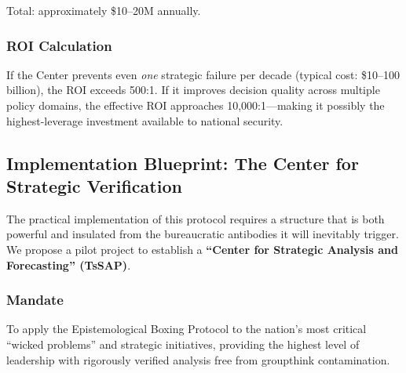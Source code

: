 \documentclass[11pt,a4paper]{article}
\begin{document}
\noindent Total: approximately \$10--20M annually.

\subsubsection{ROI Calculation}
If the Center prevents even \textit{one} strategic failure per decade (typical cost: \$10--100 billion), the ROI exceeds 500:1. If it improves decision quality across multiple policy domains, the effective ROI approaches 10,000:1—making it possibly the highest-leverage investment available to national security.

\subsection{Implementation Blueprint: The Center for Strategic Verification}
The practical implementation of this protocol requires a structure that is both powerful and insulated from the bureaucratic antibodies it will inevitably trigger. We propose a pilot project to establish a \textbf{``Center for Strategic Analysis and Forecasting'' (TsSAP)}.

\subsubsection{Mandate}
To apply the Epistemological Boxing Protocol to the nation's most critical ``wicked problems'' and strategic initiatives, providing the highest level of leadership with rigorously verified analysis free from groupthink contamination.
\end{document}
